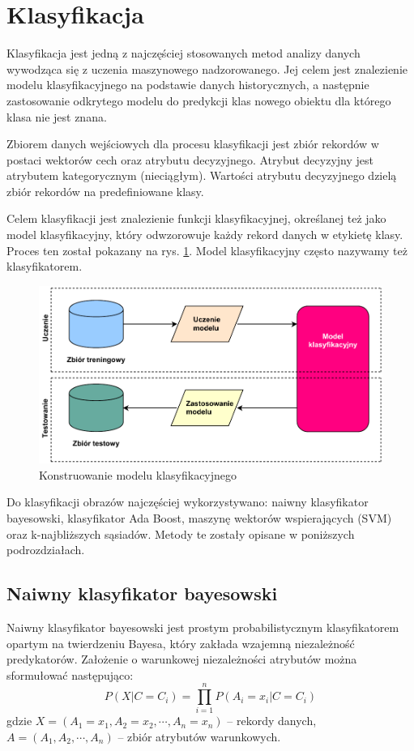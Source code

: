 \section{Klasyfikacja}
Klasyfikacja jest jedną z najczęściej stosowanych metod analizy danych wywodząca się z uczenia maszynowego nadzorowanego. Jej celem jest znalezienie modelu klasyfikacyjnego na podstawie danych historycznych, a następnie zastosowanie odkrytego modelu do predykcji klas nowego obiektu dla którego klasa nie jest znana.

Zbiorem danych wejściowych dla procesu klasyfikacji jest zbiór rekordów w postaci wektorów cech oraz atrybutu decyzyjnego. Atrybut decyzyjny jest atrybutem kategorycznym (nieciągłym). Wartości atrybutu decyzyjnego dzielą zbiór rekordów na predefiniowane klasy.

Celem klasyfikacji jest znalezienie funkcji klasyfikacyjnej, określanej też jako model klasyfikacyjny, który odwzorowuje każdy rekord danych w etykietę klasy. Proces ten został pokazany na rys. \ref{fig:classification-model}. Model klasyfikacyjny często nazywamy też klasyfikatorem.\cite{MORZY13}

\begin{figure}[h]
	\centering
	\includegraphics[scale=1.0]{graphics/01_podstawy_teoretyczne/classification-model.pdf}
	\caption{ Konstruowanie modelu klasyfikacyjnego \cite{MORZY13} }
	\label{fig:classification-model}
\end{figure}

Do klasyfikacji obrazów najczęściej wykorzystywano: naiwny klasyfikator bayesowski, klasyfikator Ada Boost, maszynę wektorów wspierających (SVM) oraz k-najbliższych sąsiadów. Metody te zostały opisane w poniższych podrozdziałach.
	
\subsection{Naiwny klasyfikator bayesowski}
Naiwny klasyfikator bayesowski jest prostym probabilistycznym klasyfikatorem opartym na twierdzeniu Bayesa, który zakłada wzajemną niezależność predykatorów. Założenie o warunkowej niezależności atrybutów można sformułować następująco:
\begin{equation} 
\label{bayes_p_x_c} 
P(X | C = C_i) = \prod\limits_{i = 1}^n P( A_i = x_i | C = C_i )
\end{equation} gdzie $X = (A_1 = x_1, A_2 = x_2, \cdots, A_n = x_n)$ -- rekordy danych, $A = (A_1, A_2, \cdots, A_n)$ -- zbiór atrybutów warunkowych.

